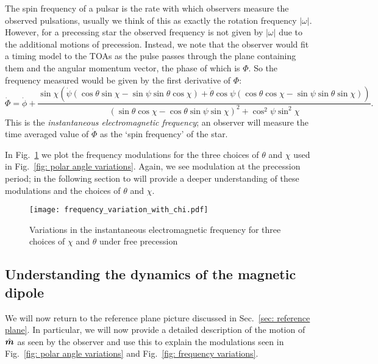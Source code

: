 \documentclass[../full_thesis/full_thesis.tex]{subfiles}
\begin{document}
The spin frequency of a pulsar is the rate with which observers measure the
observed pulsations, usually we think of this as exactly the rotation frequency
$|\omega|$. However, for a precessing star the observed frequency is not given by
$|\omega|$ due to the additional motions of precession. Instead, we note that the
observer would fit a timing model to the TOAs as the pulse passes through the
plane containing them and the angular momentum vector, the phase of which is
$\Phi$. So the frequency measured would be given by the first derivative of $\Phi$:
\begin{equation}
\dot{\Phi} = \dot{\phi}
+ \frac{\sin\chi \left(
\dot{\psi} (\cos\theta\sin\chi - \sin \psi \sin \theta \cos\chi) +
\dot{\theta} \cos\psi (\cos\theta\cos\chi - \sin \psi \sin \theta \sin\chi)\right)
}{(\sin\theta \cos \chi - \cos \theta \sin \psi \sin \chi)^{2} + \cos^{2}\psi \sin^{2} \chi}.
\label{eqn: Phi_dot}
\end{equation}
This is the \emph{instantaneous electromagnetic frequency}; an observer
will measure the time averaged value of $\dot{\Phi}$ as the `spin frequency' of
the star.

In Fig.~\ref{fig: frequency variations} we plot the frequency modulations for
the three choices of $\theta$ and $\chi$ used in Fig.~\ref{fig: polar angle variations}.
Again, we see modulation at the precession period; in the following section to
will provide a deeper understanding of these modulations and the choices of
$\theta$ and $\chi$.
\begin{figure}[htb]
\centering
  \texttt{[image: frequency\_variation\_with\_chi.pdf]}
\caption{Variations in the instantaneous electromagnetic frequency for three choices
of $\chi$ and $\theta$ under free precession}
\label{fig: frequency variations}
\end{figure}


\subsection{Understanding the dynamics of the magnetic dipole}
\label{sec: understanding the motion of m}

We will now return to the reference plane picture discussed in Sec.~\ref{sec:
reference plane}. In particular, we will now provide a detailed description of
the motion of $\hat{\boldsymbol{m}}$ as seen by the observer and use this to explain the
modulations seen in Fig.~\ref{fig: polar angle variations} and Fig.~\ref{fig:
frequency variations}.
\end{document}
